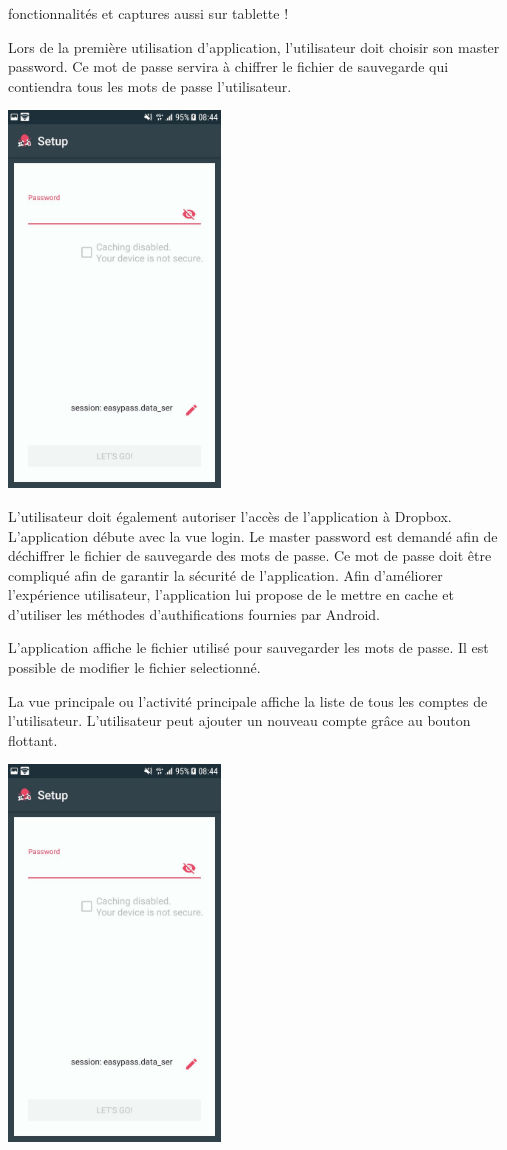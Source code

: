 
fonctionnalités et captures aussi sur tablette !

Lors de la première utilisation d'application, l'utilisateur doit choisir son master password. Ce mot de passe servira à chiffrer le fichier de sauvegarde qui contiendra tous les mots de passe l'utilisateur.

\includegraphics[height=10cm]{login.jpg}

L'utilisateur doit également autoriser l'accès de l'application à Dropbox.
L'application débute avec la vue login. Le master password est demandé afin de déchiffrer le fichier de sauvegarde des mots de passe. Ce mot de passe doit être compliqué afin de garantir la sécurité de l'application. Afin d'améliorer l'expérience utilisateur, l'application \easypass{} lui propose de le mettre en cache et d'utiliser les méthodes d'authifications fournies par Android.

L'application affiche le fichier utilisé pour sauvegarder les mots de passe. Il est possible de modifier le fichier selectionné.

La vue principale ou l'activité principale affiche la liste de tous les comptes de l'utilisateur. L'utilisateur peut ajouter un nouveau compte grâce au bouton flottant.

\includegraphics[height=10cm]{login.jpg}

